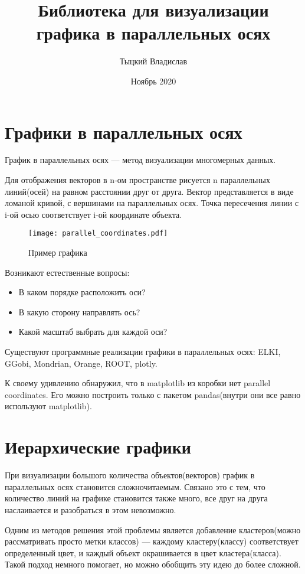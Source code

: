 \documentclass[12pt,fleqn]{article}
\title{Библиотека для визуализации графика в параллельных осях}
\author{Тыцкий Владислав}
\date{Ноябрь 2020}
\begin{document}
\maketitle
\section{Графики в параллельных осях}
График в параллельных осях --- метод визуализации многомерных данных.

Для отображения векторов в n-ом пространстве рисуется n параллельных линий(осей) на равном расстоянии друг 
от друга. Вектор представляется в виде ломаной кривой, с вершинами на параллельных осях. Точка пересечения
линии с i-ой осью соответствует i-ой координате объекта.

\begin{wrapfigure}[9]{r}{0.4\textwidth}
    \texttt{[image: parallel\_coordinates.pdf]} 
    \caption{Пример графика}
    \label{parallel_coords}
\end{wrapfigure}
Возникают естественные вопросы:
\begin{itemize}
    \item В каком порядке расположить оси?
    \item В какую сторону направлять ось?
    \item Какой масштаб выбрать для каждой оси?
\end{itemize}
Существуют программные реализации графики в параллельных осях: ELKI, GGobi, Mondrian,
Orange, ROOT, plotly.

К своему удивлению обнаружил, что в matplotlib из коробки нет parallel coordinates. Его можно построить только
с пакетом pandas(внутри они все равно используют matplotlib).
\newline

\section{Иерархические графики}
При визуализации большого количества объектов(векторов) график в параллельных осях становится сложночитаемым.
Связано это с тем, что количество линий на графике становится также много, все друг на друга наслаивается и разобраться
в этом невозможно.

Одним из методов решения этой проблемы является добавление кластеров(можно рассматривать просто метки классов) ---
каждому кластеру(классу) соответствует определенный цвет, и каждый объект окрашивается в цвет кластера(класса).
Такой подход немного помогает, но можно обобщить эту идею до более сложной.
\end{document}
